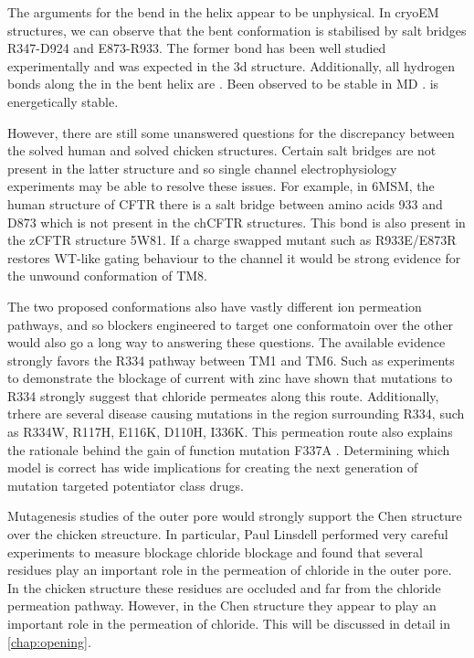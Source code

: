 The arguments for the bend in the helix appear to be unphysical. In cryoEM structures, we can observe that the bent conformation is stabilised by salt bridges R347-D924 and E873-R933. The former bond has been well studied experimentally and was expected in the 3d structure. Additionally, all hydrogen bonds along the in the bent helix are . Been observed to be stable in MD \cite{corradi2018} .  is energetically stable.

However, there are still some unanswered questions for the discrepancy between the solved human and solved chicken structures. Certain salt bridges are not present in the latter structure and so single channel electrophysiology experiments may be able to resolve these issues. For example, in 6MSM, the human structure of CFTR there is a salt bridge between amino acids 933 and D873 which is not present in the chCFTR structures. This bond is also present in the zCFTR structure 5W81. If a charge swapped mutant such as R933E/E873R restores WT-like gating behaviour to the channel it would be  strong evidence for the unwound conformation of TM8. 

The two proposed conformations also have vastly different ion permeation pathways, and so blockers engineered to target one conformatoin over the other would also go a long way to answering these questions. The available evidence strongly favors the R334 pathway between TM1 and TM6. Such as experiments to  demonstrate the blockage of current with zinc have shown that mutations to R334 strongly suggest that chloride permeates along this route. Additionally, trhere are several disease causing mutations in the region surrounding R334, such as R334W, R117H, E116K, D110H, I336K\cite{cftr2}. This permeation route also explains the rationale behind the gain of function mutation F337A \cite{}. Determining which model is correct has wide implications for creating the next generation of mutation targeted potentiator class drugs.

Mutagenesis studies of the outer pore would strongly support the Chen structure over the chicken streucture. In particular, Paul Linsdell performed very careful experiments to measure blockage chloride blockage and found that several residues play an important role in the permeation of chloride in the outer pore. In the chicken structure these residues are occluded and far from the chloride permeation pathway. However, in the Chen structure they appear to play an important role in the permeation of chloride. This will be discussed in detail in \ref{chap:opening}.

